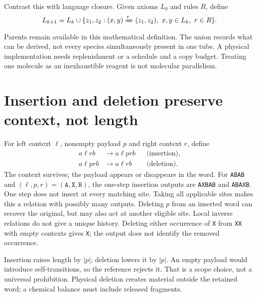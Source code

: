 Contrast this with language closure. Given axioms $L_0$ and rules $R$, define
\begin{equation}
 L_{k+1}=L_k\cup
 \{z_1,z_2:(x,y)\xRightarrow{r}(z_1,z_2),\ x,y\in L_k,\ r\in R\}.
 \label{eq:closure}
\end{equation}
Parents remain available in this mathematical definition. The union records
what can be derived, not every species simultaneously present in one tube.
A physical implementation needs replenishment or a schedule and a copy budget.
Treating one molecule as an inexhaustible reagent is not molecular parallelism.

\section{Insertion and deletion preserve context, not length}
For left context $\ell$, nonempty payload $p$ and right context $r$, define
\begin{align}
 a\ell r b&\longrightarrow a\ell p r b &&\text{(insertion)},\\
 a\ell p r b&\longrightarrow a\ell r b &&\text{(deletion)}.
 \label{eq:delete}
\end{align}
The context survives; the payload appears or disappears in the word.
For \texttt{ABAB} and $(\ell,p,r)=(\texttt{A},\texttt{X},\texttt{B})$,
the one-step insertion outputs are \texttt{AXBAB} and \texttt{ABAXB}.
One step does not insert at every matching site.
Taking all applicable sites makes this a relation with possibly many outputs.
Deleting $p$ from an inserted word can recover the original, but may also act
at another eligible site. Local inverse relations do not give a unique history.
Deleting either occurrence of \texttt{X} from \texttt{XX} with empty contexts
gives \texttt{X}; the output does not identify the removed occurrence.

Insertion raises length by $|p|$; deletion lowers it by $|p|$. An empty payload
would introduce self-transitions, so the reference rejects it. That is a scope
choice, not a universal prohibition. Physical deletion creates material outside
the retained word; a chemical balance must include released fragments.

